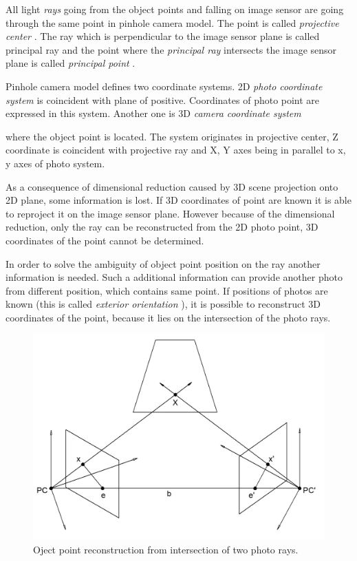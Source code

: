 \documentclass[a4paper,12pt]{article}
\newcommand{\term}[1]{
{\it #1}
}
\begin{document}
All light \term{rays} going from the object points and falling on image sensor are going through the same point in pinhole camera model.
The point is called \term{projective center}. The ray which is perpendicular to the image sensor plane is called principal ray and the point 
where the \term{principal ray} intersects the image sensor plane is called \term{principal point}.

Pinhole camera model defines two coordinate systems. 2D  \term{photo coordinate system} is coincident
with plane of positive.
Coordinates of photo point are expressed in this system. Another one is 3D \term{camera coordinate system}
where the object point is located. The system originates in projective center, Z coordinate 
 is coincident with projective ray and X, Y axes being in parallel to x, y axes of photo system.

 
As a consequence of dimensional reduction caused by 
3D scene projection onto 2D plane, some information is lost.
If 3D coordinates of point are known it is able to reproject it on the image sensor plane. However because 
of the dimensional reduction,  only the ray can be reconstructed from the 2D photo point,
3D coordinates of the point cannot be determined.
 
In order to solve the ambiguity of object point position on the ray another information is needed.  
Such a additional information can provide another photo from different position, which contains same point. 
If positions of photos 
 are known (this is called\term{ exterior orientation}), it is possible 
to reconstruct 3D coordinates of the point, because it lies on the intersection of the photo rays.

\begin{figure}[h]
    \centering
    \includegraphics[scale=0.2]{figures/object_point_intersection.png}
    \caption{Oject point reconstruction from intersection of two photo rays.}
    \label{fig:obj_intersec}
\end{figure}
\end{document}
